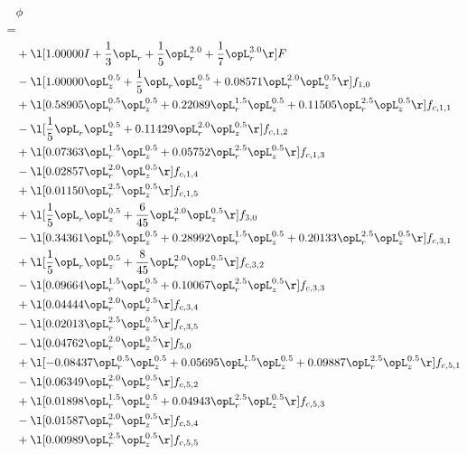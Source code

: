 \begin{alignat}{2} 
\label{eq:scalarFlux_0} 
& \phi \nonumber \\ 
 = \\ 
& + \l[  1.00000 I + \frac{1}{3} \opL_r + \frac{1}{5} \opL_r^{2.0} + \frac{1}{7} \opL_r^{3.0}  \r] F \nonumber \\ 
& - \l[  1.00000 \opL_z^{0.5} + \frac{1}{5} \opL_r \opL_z^{0.5} +  0.08571 \opL_r^{2.0} \opL_z^{0.5}  \r] f_{1,0} \nonumber \\ 
& + \l[  0.58905 \opL_r^{0.5} \opL_z^{0.5} +  0.22089 \opL_r^{1.5} \opL_z^{0.5} +  0.11505 \opL_r^{2.5} \opL_z^{0.5}  \r] f_{c,1,1} \nonumber \\ 
& - \l[ \frac{1}{5} \opL_r \opL_z^{0.5} +  0.11429 \opL_r^{2.0} \opL_z^{0.5}  \r] f_{c,1,2} \nonumber \\ 
& + \l[  0.07363 \opL_r^{1.5} \opL_z^{0.5} +  0.05752 \opL_r^{2.5} \opL_z^{0.5}  \r] f_{c,1,3} \nonumber \\ 
& - \l[  0.02857 \opL_r^{2.0} \opL_z^{0.5}  \r] f_{c,1,4} \nonumber \\ 
& + \l[  0.01150 \opL_r^{2.5} \opL_z^{0.5}  \r] f_{c,1,5} \nonumber \\ 
& + \l[ \frac{1}{5} \opL_r \opL_z^{0.5} + \frac{6}{45} \opL_r^{2.0} \opL_z^{0.5}  \r] f_{3,0} \nonumber \\ 
& - \l[  0.34361 \opL_r^{0.5} \opL_z^{0.5} +  0.28992 \opL_r^{1.5} \opL_z^{0.5} +  0.20133 \opL_r^{2.5} \opL_z^{0.5}  \r] f_{c,3,1} \nonumber \\ 
& + \l[ \frac{1}{5} \opL_r \opL_z^{0.5} + \frac{8}{45} \opL_r^{2.0} \opL_z^{0.5}  \r] f_{c,3,2} \nonumber \\ 
& - \l[  0.09664 \opL_r^{1.5} \opL_z^{0.5} +  0.10067 \opL_r^{2.5} \opL_z^{0.5}  \r] f_{c,3,3} \nonumber \\ 
& + \l[  0.04444 \opL_r^{2.0} \opL_z^{0.5}  \r] f_{c,3,4} \nonumber \\ 
& - \l[  0.02013 \opL_r^{2.5} \opL_z^{0.5}  \r] f_{c,3,5} \nonumber \\ 
& - \l[  0.04762 \opL_r^{2.0} \opL_z^{0.5}  \r] f_{5,0} \nonumber \\ 
& + \l[  -0.08437 \opL_r^{0.5} \opL_z^{0.5} +  0.05695 \opL_r^{1.5} \opL_z^{0.5} +  0.09887 \opL_r^{2.5} \opL_z^{0.5}  \r] f_{c,5,1} \nonumber \\ 
& - \l[  0.06349 \opL_r^{2.0} \opL_z^{0.5}  \r] f_{c,5,2} \nonumber \\ 
& + \l[  0.01898 \opL_r^{1.5} \opL_z^{0.5} +  0.04943 \opL_r^{2.5} \opL_z^{0.5}  \r] f_{c,5,3} \nonumber \\ 
& - \l[  0.01587 \opL_r^{2.0} \opL_z^{0.5}  \r] f_{c,5,4} \nonumber \\ 
& + \l[  0.00989 \opL_r^{2.5} \opL_z^{0.5}  \r] f_{c,5,5} \nonumber \\ 
\end{alignat} 



